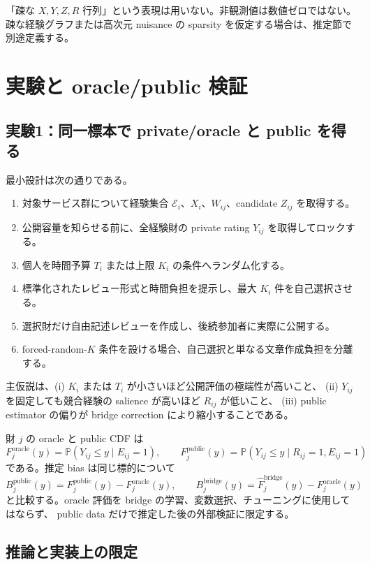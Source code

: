 \documentclass[a4paper,11pt]{ltjsarticle}
\newcommand{\Prb}{\mathbb P}
\newcommand{\1}{\mathbf 1}
\newcommand{\cE}{\mathcal E}
\theoremstyle{definition}
\theoremstyle{plain}
\theoremstyle{remark}
\begin{document}
「疎な $X,Y,Z,R$ 行列」という表現は用いない。非観測値は数値ゼロではない。
疎な経験グラフまたは高次元 nuisance の sparsity を仮定する場合は、推定節で別途定義する。

\section{実験と oracle/public 検証}

\subsection{実験1：同一標本で private/oracle と public を得る}

最小設計は次の通りである。
\begin{enumerate}
  \item 対象サービス群について経験集合 $\cE_i$、$X_i$、$W_{ij}$、candidate $Z_{ij}$ を取得する。
  \item 公開容量を知らせる前に、全経験財の private rating $Y_{ij}$ を取得してロックする。
  \item 個人を時間予算 $T_i$ または上限 $K_i$ の条件へランダム化する。
  \item 標準化されたレビュー形式と時間負担を提示し、最大 $K_i$ 件を自己選択させる。
  \item 選択財だけ自由記述レビューを作成し、後続参加者に実際に公開する。
  \item forced-random-$K$ 条件を設ける場合、自己選択と単なる文章作成負担を分離する。
\end{enumerate}

主仮説は、(i) $K_i$ または $T_i$ が小さいほど公開評価の極端性が高いこと、
(ii) $Y_{ij}$ を固定しても競合経験の salience が高いほど $R_{ij}$ が低いこと、
(iii) public estimator の偏りが bridge correction により縮小することである。

財 $j$ の oracle と public CDF は
\[
 F_j^{\mathrm{oracle}}(y)=\Prb(Y_{ij}\le y\mid E_{ij}=1),
 \qquad
 F_j^{\mathrm{public}}(y)=\Prb(Y_{ij}\le y\mid R_{ij}=1,E_{ij}=1)
 \tag{27}
\]
である。推定 bias は同じ標的について
\[
 B_j^{\mathrm{public}}(y)
 =F_j^{\mathrm{public}}(y)-F_j^{\mathrm{oracle}}(y),
 \qquad
 B_j^{\mathrm{bridge}}(y)
 =\widehat F_j^{\mathrm{bridge}}(y)-F_j^{\mathrm{oracle}}(y)
 \tag{28}
\]
と比較する。oracle 評価を bridge の学習、変数選択、チューニングに使用してはならず、
public data だけで推定した後の外部検証に限定する。

\subsection{推論と実装上の限定}
\end{document}
